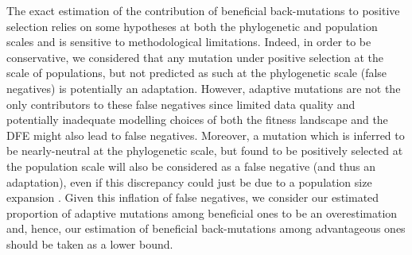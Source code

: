 \documentclass{article}
\begin{document}
    The exact estimation of the contribution of beneficial back-mutations to positive selection relies on some hypotheses at both the phylogenetic and population scales and is sensitive to methodological limitations.
    Indeed, in order to be conservative, we considered that any mutation under positive selection at the scale of populations, but not predicted as such at the phylogenetic scale (false negatives) is potentially an adaptation.
    However, adaptive mutations are not the only contributors to these false negatives since limited data quality and potentially inadequate modelling choices of both the fitness landscape and the DFE might also lead to false negatives.
    Moreover, a mutation which is inferred to be nearly-neutral at the phylogenetic scale, but found to be positively selected at the population scale will also be considered as a false negative (and thus an adaptation), even if this discrepancy could just be due to a population size expansion \cite{lanfear_population_2014, jones_shifting_2017, platt_protein_2018}.
    Given this inflation of false negatives, we consider our estimated proportion of adaptive mutations among beneficial ones to be an overestimation and, hence, our estimation of beneficial back-mutations among advantageous ones should be taken as a lower bound.
\end{document}
